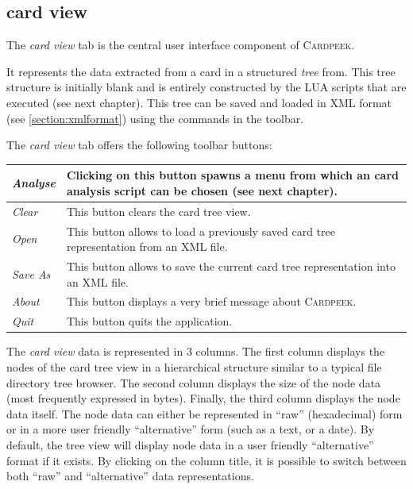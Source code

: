 \documentclass[11pt]{report}
\newcommand{\Cardpeek}{\textsc{Cardpeek}}
\begin{document}
\subsection{card view}

The \emph{card view} tab is the central user interface component of \Cardpeek. 

It represents the data extracted from a card in a structured \emph{tree} from.
This tree structure is initially blank and is entirely constructed by the LUA scripts that are executed (see next chapter).
This tree can be saved and loaded in XML format (see \ref{section:xmlformat}) using the commands in the toolbar.

The \emph{card view} tab offers the following toolbar buttons:

\vspace{1em}\noindent
\begin{tabular}{l|p{12cm}}
\hline
\emph{Analyse}    & Clicking on this button spawns a menu from which an card analysis script can be chosen (see next chapter). \\  
\hline
\emph{Clear}      & This button clears the card tree view.\\
\hline
\emph{Open}       & This button allows to load a previously saved card tree representation from an XML file.\\
\hline
\emph{Save As}    & This button allows to save the current card tree representation into an XML file. \\
\hline
\emph{About}      & This button displays a very brief message about \Cardpeek. \\
\hline
\emph{Quit}       & This button quits the application. \\
\hline
\end{tabular}
\vspace{2em}

The \emph{card view} data is represented in 3 columns. The first column displays the nodes of the card tree view
in a hierarchical structure similar to a typical file directory tree browser. The second column displays the size
of the node data (most frequently expressed in bytes). Finally, the third column displays the node data itself.
The node data can either be represented in ``raw'' (hexadecimal) form or in a more user friendly ``alternative'' form
(such as a text, or a date).
By default, the tree view will display node data in a user friendly ``alternative'' format if it exists. 
By clicking on the column title, it is possible to switch between both ``raw'' and ``alternative'' data representations.
\end{document}
